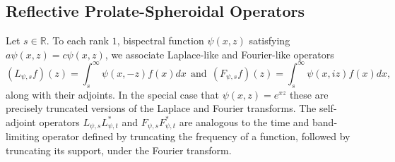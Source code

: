 \documentclass[11pt,letterpaper]{article}
\theoremstyle{definition}
\newcommand{\bbr}{\mathbb{R}}
\begin{document}
\subsection{Reflective Prolate-Spheroidal Operators}
Let $s\in\bbr$.
To each rank $1$, bispectral function $\psi(x,z)$ satisfying $a\psi(x,z) = c\psi(x,z)$, we associate Laplace-like and Fourier-like operators
$$( L_{\psi,s} f)(z) = \int_s^\infty \psi(x,-z)f(x)dx\ \ \text{and}\ \ ( F_{\psi,s} f)(z) = \int_s^\infty \psi(x,iz)f(x)dx,$$
along with their adjoints.
In the special case that $\psi(x,z) = e^{xz}$ these are precisely truncated versions of the Laplace and Fourier transforms.
The self-adjoint operators $L_{\psi,s}L_{\psi,t}^*$ and $F_{\psi,s}F_{\psi,t}^*$ are analogous to the time and band-limiting operator defined by truncating the frequency of a function, followed by truncating its support, under the Fourier transform.
\end{document}

